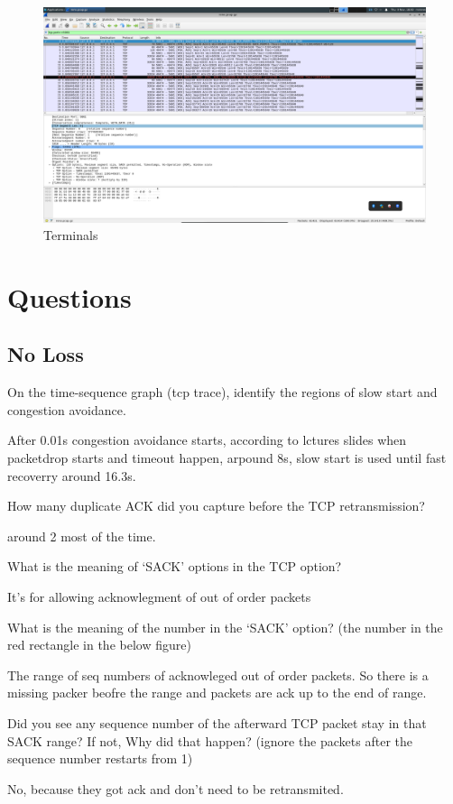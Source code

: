 \documentclass{article}
\begin{document}
\begin{figure}[htp]
    \centering
    \includegraphics[width=.9\textwidth]{screenshot}%
    \caption{Terminals}
\end{figure}

\clearpage
\section*{Questions}
\subsection*{No Loss}
\noindent
On the time-sequence graph (tcp trace), identify the regions of slow start and
congestion avoidance.

After 0.01s congestion avoidance starts, according to lctures slides when packetdrop starts and timeout happen, arpound 8s, slow start is used until fast recoverry around 16.3s.

\noindent
How many duplicate ACK did you capture before the TCP retransmission?

around 2 most of the time.

\noindent
What is the meaning of `SACK' options in the TCP option?

It's for allowing acknowlegment of out of order packets

\noindent
What is the meaning of the number in the `SACK' option? (the number in the red
rectangle in the below figure)

The range of seq numbers of acknowleged out of order packets. So there is a missing packer beofre the range and packets are ack up to the end of range.

\noindent
Did you see any sequence number of the afterward TCP packet stay in that SACK range? If not, Why did that happen? (ignore the packets after the sequence number restarts from 1)

No, because they got ack and don't need to be retransmited.
\end{document}
